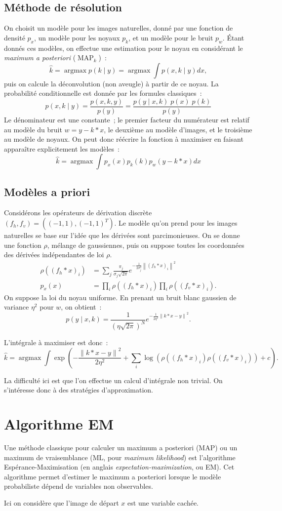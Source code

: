 \documentclass[french,a4paper]{article}
\theoremstyle{plain}
\theoremstyle{definition}
\theoremstyle{remark}
\DeclareMathOperator*{\argmax}{argmax}
\DeclareMathOperator{\MAP}{MAP}
\newcommand{\norm}[1]{\left\lVert #1 \right\rVert}
\begin{document}
\subsection{Méthode de résolution}
On choisit un modèle pour les images naturelles, donné par une fonction de densité $p_x$, un modèle pour les noyaux $p_k$, et un modèle pour le bruit $p_w$.
Étant donnés ces modèles, on effectue une estimation pour le noyau en considérant le \emph{maximum a posteriori} ($\MAP_k$)~:
\[
\hat{k} = \argmax p\left( k \mid y \right) = \argmax \int p\left( x,k \mid y \right) dx,
\]
puis on calcule la déconvolution (non aveugle) à partir de ce noyau. La probabilité conditionnelle est donnée par les formules classiques~:
\[
p\left(x,k \mid y \right) = \frac{p(x,k,y)}{p(y)} = \frac{p(y \mid x,k) \; p(x) \; p(k)}{p(y)}
\]
Le dénominateur est une constante~; le premier facteur du numérateur est relatif au modèle du bruit $w = y - k*x$, le deuxième au modèle d'images, et le troisième au modèle de noyaux. On peut donc réécrire la fonction à maximiser en faisant apparaître explicitement les modèles~:
\[
\hat{k} = \argmax \int p_x(x) p_k(k) p_w(y - k*x) dx
\]

\subsection{Modèles a priori}

Considérons les opérateurs de dérivation discrète $(f_h,f_v) = ((-1,1),(-1,1)^T)$. Le modèle qu'on prend pour les images naturelles se base sur l'idée que les dérivées sont parcimonieuses. On se donne une fonction $\rho$, mélange de gaussiennes, puis on suppose toutes les coordonnées des dérivées indépendantes de loi $\rho$.
\begin{align*}
\rho((f_h*x)_i) &= \sum_j \frac{\pi_j}{\sigma_j \sqrt{2\pi}}e^{-\frac{1}{2\sigma_j^2}\norm{(f_h*x)_i}^2} \\
p_x(x) &= \prod_i \rho\left((f_h*x)_i \right) \prod_i \rho\left((f_v*x)_i\right) .
\end{align*}
On suppose la loi du noyau uniforme. En prenant un bruit blanc gaussien de variance $\eta^2$ pour $w$, on obtient~:
\[
p(y\mid x,k) = \frac{1}{(\eta\sqrt{2\pi})^N} e^{-\frac{1}{2\eta^2}\norm{k*x-y}^2} .
\]

L'intégrale à maximiser est donc~:
\[
\hat{k} = \argmax \int \exp\left( - \frac{\norm{k*x-y}^2}{2\eta^2} +  \sum_i \log\left(\rho((f_h*x)_i)\rho((f_v*x)_i)\right)  + c \right) .
\]

La difficulté ici est que l'on effectue un calcul d'intégrale non trivial. On s'intéresse donc à des stratégies d'approximation.

\section{Algorithme EM}
Une méthode classique pour calculer un maximum a posteriori (MAP) ou un maximum de vraisemblance (ML, pour \textit{maximum likelihood}) est l'algorithme Espérance-Maximisation (en anglais \textit{expectation-maximization}, ou EM). Cet algorithme permet d'estimer le maximum a posteriori lorsque le modèle probabiliste dépend de variables non observables.

Ici on considère que l'image de départ $x$ est une variable cachée. 
\end{document}
